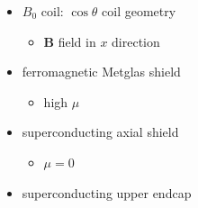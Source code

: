 \documentclass[handout]{beamer}
\renewcommand{\vec}{\mathbf}
\begin{document}
\begin{frame}
\begin{columns}
    \begin{column}{0.5\textwidth}
    \begin{itemize}
        \item $B_0$ coil: $\cos\theta$ coil geometry \pause
            \begin{itemize}
                \item $\vec{B}$ field in $x$ direction \pause
            \end{itemize}
        \bigskip
        \item ferromagnetic Metglas shield\pause
            \begin{itemize}
                \item high $\mu$ \pause
            \end{itemize}
        \item superconducting axial shield \pause
            \begin{itemize}
                \item $\mu = 0$ \pause
            \end{itemize}
        \bigskip
        \item superconducting upper endcap
    \end{itemize}
    \end{column}

    \end{columns}

\end{frame}
\end{document}
